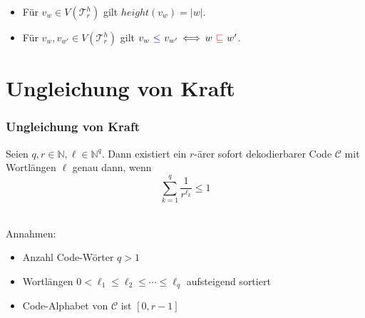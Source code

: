 \documentclass{beamer}
\begin{document}
\begin{frame}[t]
\begin{center}
    \end{center}
    \pause
    \begin{itemize}
        \setlength\itemsep{2em}
        \item Für $v_w \in V(\mathcal{T}_r^h)$ gilt $height(v_w) = |w|$.
        \pause
        \item Für $v_w, v_{w'} \in V(\mathcal{T}_r^h)$ gilt
            $v_w\ {\color{blue}\leq}\ v_{w'} \,\Longleftrightarrow\, w\ {\color{red}\sqsubseteq}\ w'$.
    \end{itemize}
\end{frame}

\section{Ungleichung von Kraft}
\begin{frame}
    \frametitle{Ungleichung von Kraft}
    Seien $q,r \in \mathbb{N}, \ell \in \mathbb{N}^q$. Dann existiert ein $r$-ärer sofort dekodierbarer Code $\mathcal{C}$
    mit Wortlängen $\ell$ genau dann, wenn
    $$
        \sum_{k=1}^{q} \frac{1}{r^{\ell_k}} \leq 1
    $$\\[20pt]
    \pause

    Annahmen:

    \begin{itemize}
        \setlength\itemsep{1em}
        \item Anzahl Code-Wörter $q > 1$
        \item Wortlängen $0 < \ell_1 \leq \ell_2 \leq \cdots \leq \ell_q$
            aufsteigend sortiert
        \item Code-Alphabet von $\mathcal{C}$ ist $[0,r-1]$
    \end{itemize}
\end{frame}
\end{document}
